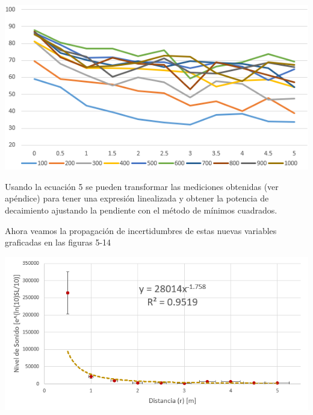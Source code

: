 \documentclass[DIV=calc, paper=a4, fontsize=11pt]{scrartcl}
\newenvironment{Figura}
  {\par\medskip\noindent\minipage{\linewidth}}
  {\endminipage\par\medskip}
\begin{document}
\begin{multicols}{2}
\begin{Figura}
\centering
    \includegraphics[width=1\textwidth]{grafica sonido 2.PNG}
    \label{fig}
\end{Figura}

Usando la ecuación 5 se pueden transformar las mediciones obtenidas (ver apéndice) para tener una expresión linealizada y obtener la potencia de decaimiento ajustando la pendiente con el método de mínimos cuadrados.

Ahora veamos la propagación de incertidumbres de estas nuevas variables graficadas en las figuras 5-14



\begin{Figura}
\centering
    \includegraphics[width=1\textwidth]{grafica 100 Hz.PNG}
    \label{fig}
\end{Figura}


\end{multicols}
\end{document}
